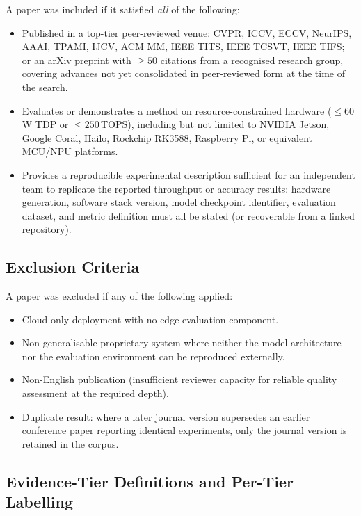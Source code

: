\documentclass[11pt,a4paper]{article}
\begin{document}
A paper was included if it satisfied \emph{all} of the following:

\begin{itemize}[leftmargin=*, noitemsep]
  \item Published in a top-tier peer-reviewed venue: CVPR, ICCV,
    ECCV, NeurIPS, AAAI, TPAMI, IJCV, ACM MM, IEEE TITS, IEEE TCSVT,
    IEEE TIFS; or an arXiv preprint with $\geq 50$ citations from
    a recognised research group, covering advances not yet
    consolidated in peer-reviewed form at the time of the search.
  \item Evaluates or demonstrates a method on resource-constrained
    hardware ($\leq 60$\,W TDP or $\leq 250$\,TOPS), including but
    not limited to NVIDIA Jetson, Google Coral, Hailo, Rockchip
    RK3588, Raspberry Pi, or equivalent MCU/NPU platforms.
  \item Provides a reproducible experimental description sufficient
    for an independent team to replicate the reported throughput or
    accuracy results: hardware generation, software stack version,
    model checkpoint identifier, evaluation dataset, and metric
    definition must all be stated (or recoverable from a linked
    repository).
\end{itemize}

\subsection{Exclusion Criteria}

A paper was excluded if any of the following applied:

\begin{itemize}[leftmargin=*, noitemsep]
  \item Cloud-only deployment with no edge evaluation component.
  \item Non-generalisable proprietary system where neither the model
    architecture nor the evaluation environment can be reproduced
    externally.
  \item Non-English publication (insufficient reviewer capacity for
    reliable quality assessment at the required depth).
  \item Duplicate result: where a later journal version supersedes an
    earlier conference paper reporting identical experiments, only the
    journal version is retained in the corpus.
\end{itemize}

\subsection{Evidence-Tier Definitions and Per-Tier Labelling}
\label{subsec:evidence_tiers}
\end{document}

